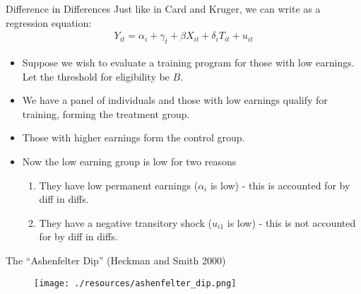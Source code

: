 \documentclass[xcolor=pdftex,dvipsnames,table,mathserif,aspectratio=169]{beamer}
\begin{document}
\begin{frame}{Difference in Differences}
Just like in Card and Kruger, we can write as a regression equation:
\begin{align*}
 Y_{it} =\alpha_i +\gamma_t +\beta X_{it} + \delta_i T_{it}  + u_{it}
 \end{align*}
\begin{itemize}
\item Suppose we wish to evaluate a training program for those with low
earnings. Let the threshold for eligibility be $B$.
\item We have a panel of individuals and those with low earnings qualify for
training, forming the treatment group.
\item Those with higher earnings form the control group. 
\item Now the low earning group is low for two reasons
\begin{enumerate}
\item They have low permanent earnings ($\alpha_i$ is low) - this is accounted for by diff in diffs.
\item They have a negative transitory shock ($u_{i1}$ is low) - this is not accounted for by diff in diffs.
\end{enumerate} 
\end{itemize}
\end{frame} 

\begin{frame}{The ``Ashenfelter Dip'' (Heckman and Smith 2000)}
\begin{figure}
\centering
\texttt{[image: ./resources/ashenfelter\_dip.png]}
\end{figure}
\end{frame}
\end{document}
